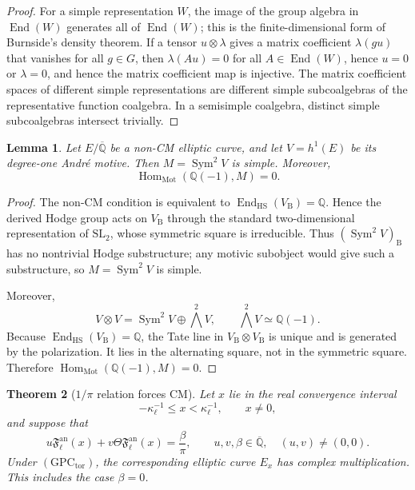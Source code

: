 \documentclass[11pt,a4paper]{amsart} %
\newtheorem{theorem}{Theorem}[section]
\newtheorem{lemma}[theorem]{Lemma}
\theoremstyle{definition}
\newcommand{\Q}{\mathbb Q}
\newcommand{\Qbar}{\overline{\mathbb Q}}
\newcommand{\Mot}{\mathrm{Mot}}
\newcommand{\Sym}{\operatorname{Sym}}
\newcommand{\Hom}{\operatorname{Hom}}
\newcommand{\End}{\operatorname{End}}
\newcommand{\Betti}{\mathrm B}
\begin{document}
\begin{proof}
For a simple representation \(W\), the image of the group algebra in \(\End(W)\) generates all of \(\End(W)\); this is the finite-dimensional form of Burnside's density theorem.
If a tensor \(u\otimes\lambda\) gives a matrix coefficient \(\lambda(gu)\) that vanishes for all \(g\in G\), then \(\lambda(Au)=0\) for all \(A\in\End(W)\), hence \(u=0\) or \(\lambda=0\), and hence the matrix coefficient map is injective. The matrix coefficient spaces of different simple representations are different simple subcoalgebras of the representative function coalgebra. In a semisimple coalgebra, distinct simple subcoalgebras intersect trivially.
\end{proof}

\begin{lemma}\label{lem:noncm}
Let \(E/\Qbar\) be a non-CM elliptic curve, and let \(V=h^1(E)\) be its
degree-one André motive. Then \(M=\Sym^2V\) is simple. Moreover,
\[
\Hom_{\Mot}(\Q(-1),M)=0.
\]
\end{lemma}

\begin{proof}
The non-CM condition is equivalent to
\(\End_{\mathrm{HS}}(V_{\Betti})=\Q\). Hence the derived Hodge group acts on
\(V_{\Betti}\) through the standard two-dimensional representation of
\(\mathrm{SL}_2\), whose symmetric square is irreducible. Thus
\((\Sym^2V)_{\Betti}\) has no nontrivial Hodge substructure; any motivic
subobject would give such a substructure, so \(M=\Sym^2V\) is simple.

Moreover,
\[
V\otimes V=\Sym^2V\oplus\bigwedge^2V,
\qquad
\bigwedge^2V\simeq\Q(-1).
\]
Because \(\End_{\mathrm{HS}}(V_{\Betti})=\Q\), the Tate line in
\(V_{\Betti}\otimes V_{\Betti}\) is unique and is generated by the
polarization. It lies in the alternating square, not in the symmetric square.
Therefore \(\Hom_{\Mot}(\Q(-1),M)=0\).
\end{proof}

\begin{theorem}[\(1/\pi\) relation forces CM]\label{thm:forceCM}
Let \(x\) lie in the real convergence interval
\[
-\kappa_\ell^{-1}\le x<\kappa_\ell^{-1},
\qquad x\ne0,
\]
and suppose that
\[
u{\mathfrak F}^{\mathrm{an}}_\ell(x)
+v\Theta{\mathfrak F}^{\mathrm{an}}_\ell(x)
=\frac{\beta}{\pi},
\qquad
u,v,\beta\in\Qbar,\quad (u,v)\ne(0,0).
\]
Under \((\mathrm{GPC}_{\mathrm{tor}})\), the corresponding elliptic curve
\(E_x\) has complex multiplication. This includes the case \(\beta=0\).
\end{theorem}
\end{document}

